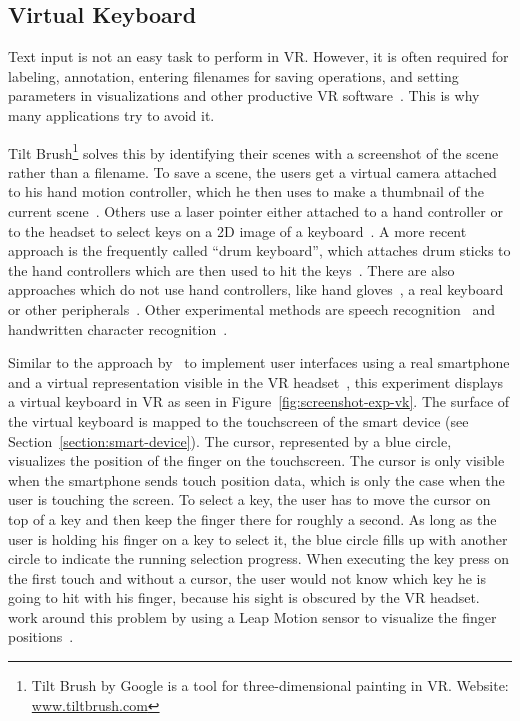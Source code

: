\subsection{Virtual Keyboard}\label{subsection:virtual-keyboard}

Text input is not an easy task to perform in \ac{VR}. However, it is often required for labeling, annotation, entering filenames for saving operations, and setting parameters in visualizations and other productive \ac{VR} software~\cite[2154]{Rhoton.2002}. This is why many applications try to avoid it. 

Tilt Brush\footnote{Tilt Brush by Google is a tool for three-dimensional painting in VR. Website: \href{https://www.tiltbrush.com/}{www.tiltbrush.com}} solves this by identifying their scenes with a screenshot of the scene rather than a filename. To save a scene, the users get a virtual camera attached to his hand motion controller, which he then uses to make a thumbnail of the current scene~\cite{GoogleLLC.2019}. %
Others use a laser pointer either attached to a hand controller or to the headset to select keys on a \ac{2D} image of a keyboard~\cite{WeelcoInc.2017}. A more recent approach is the frequently called \enquote{drum keyboard}, which attaches drum sticks to the hand controllers which are then used to hit the keys~\cite{Weisel.2017}. 
There are also approaches which do not use hand controllers, like hand gloves~\cite{Evans.1999,Rhoton.2002}, a real keyboard~\cite{McGill.2015,Walker.2017} or other peripherals~\cite[111\psq]{Gonzalez.2009}. Other experimental methods are speech recognition~\cite[2154\psqq]{Rhoton.2002} and handwritten character recognition~\cite[113]{Gonzalez.2009}.

Similar to the approach by~\citeauthor{Dias.2018} to implement user interfaces using a real smartphone and a virtual representation visible in the \ac{VR} headset~\cite[5]{Dias.2018}, this experiment displays a virtual keyboard in \ac{VR} as seen in Figure~\ref{fig:screenshot-exp-vk}. 
The surface of the virtual keyboard is mapped to the touchscreen of the smart device (see Section~\ref{section:smart-device}). The cursor, represented by a blue circle, visualizes the position of the finger on the touchscreen. The cursor is only visible when the smartphone sends touch position data, which is only the case when the user is touching the screen. To select a key, the user has to move the cursor on top of a key and then keep the finger there for roughly a second. As long as the user is holding his finger on a key to select it, the blue circle fills up with another circle to indicate the running selection progress. When executing the key press on the first touch and without a cursor, the user would not know which key he is going to hit with his finger, because his sight is obscured by the \ac{VR} headset. \citeauthor{Dias.2018} work around this problem by using a Leap Motion sensor to visualize the finger positions~\cite[4]{Dias.2018}.

